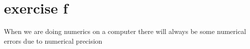 \section{exercise f}

When we are doing numerics on a computer there will always be some numerical errors due to numerical precision  